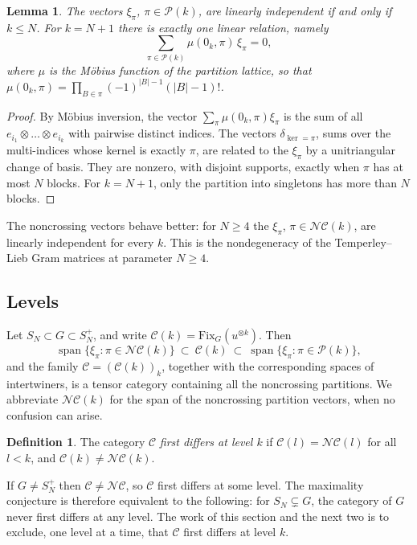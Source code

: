 \documentclass[11pt]{amsart}
\newtheorem{lemma}[theorem]{Lemma}
\theoremstyle{definition}
\newtheorem{definition}[theorem]{Definition}
\theoremstyle{remark}
\theoremstyle{plain}
\numberwithin{equation}{section}
\numberwithin{table}{section}
\newcommand{\Fix}{\mathrm{Fix}}
\newcommand{\NC}{\mathcal{NC}}
\newcommand{\Pp}{\mathcal{P}}
\DeclareMathOperator{\spn}{span}
\begin{document}
\begin{lemma}\label{lem:indep}
The vectors $\xi_\pi$, $\pi\in\Pp(k)$, are linearly independent if and only if $k\le N$. For $k=N+1$ there is exactly one linear relation, namely
\[
\sum_{\pi\in\Pp(k)}\mu(0_k,\pi)\,\xi_\pi=0,
\]
where $\mu$ is the M{\"o}bius function of the partition lattice, so that $\mu(0_k,\pi)=\prod_{B\in\pi}(-1)^{|B|-1}(|B|-1)!$.
\end{lemma}

\begin{proof}
By M{\"o}bius inversion, the vector $\sum_\pi\mu(0_k,\pi)\xi_\pi$ is the sum of all $e_{i_1}\otimes\dots\otimes e_{i_k}$ with pairwise distinct indices. The vectors $\delta_{\ker=\pi}$, sums over the multi-indices whose kernel is exactly $\pi$, are related to the $\xi_\pi$ by a unitriangular change of basis. They are nonzero, with disjoint supports, exactly when $\pi$ has at most $N$ blocks. For $k=N+1$, only the partition into singletons has more than $N$ blocks.
\end{proof}

The noncrossing vectors behave better: for $N\ge4$ the $\xi_\pi$, $\pi\in\NC(k)$, are linearly independent for every $k$. This is the nondegeneracy of the Temperley--Lieb Gram matrices at parameter $N\ge4$.

\subsection{Levels}

Let $S_N\subset G\subset S_N^+$, and write $\mathcal C(k)=\Fix_G(u^{\otimes k})$. Then
\[
\spn\{\xi_\pi:\pi\in\NC(k)\}\ \subset\ \mathcal C(k)\ \subset\ \spn\{\xi_\pi:\pi\in\Pp(k)\},
\]
and the family $\mathcal C=(\mathcal C(k))_k$, together with the corresponding spaces of intertwiners, is a tensor category containing all the noncrossing partitions. We abbreviate $\NC(k)$ for the span of the noncrossing partition vectors, when no confusion can arise.

\begin{definition}
The category $\mathcal C$ \emph{first differs at level $k$} if $\mathcal C(l)=\NC(l)$ for all $l<k$, and $\mathcal C(k)\ne\NC(k)$.
\end{definition}

If $G\ne S_N^+$ then $\mathcal C\ne\NC$, so $\mathcal C$ first differs at some level. The maximality conjecture is therefore equivalent to the following: for $S_N\subsetneq G$, the category of $G$ never first differs at any level. The work of this section and the next two is to exclude, one level at a time, that $\mathcal C$ first differs at level $k$.
\end{document}
